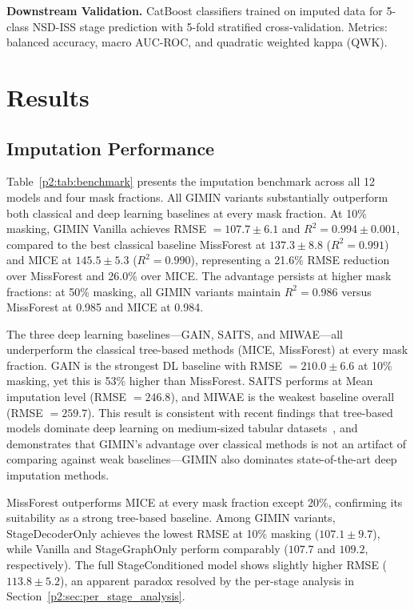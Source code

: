 \textbf{Downstream Validation.} CatBoost classifiers trained on imputed data for 5-class NSD-ISS stage prediction with 5-fold stratified cross-validation. Metrics: balanced accuracy, macro AUC-ROC, and quadratic weighted kappa (QWK).

\section{Results}
\label{p2:sec:results}

\subsection{Imputation Performance}

Table~\ref{p2:tab:benchmark} presents the imputation benchmark across all 12 models and four mask fractions. All GIMIN variants substantially outperform both classical and deep learning baselines at every mask fraction. At 10\% masking, GIMIN Vanilla achieves RMSE $= 107.7 \pm 6.1$ and $R^2 = 0.994 \pm 0.001$, compared to the best classical baseline MissForest at $137.3 \pm 8.8$ ($R^2 = 0.991$) and MICE at $145.5 \pm 5.3$ ($R^2 = 0.990$), representing a 21.6\% RMSE reduction over MissForest and 26.0\% over MICE. The advantage persists at higher mask fractions: at 50\% masking, all GIMIN variants maintain $R^2 = 0.986$ versus MissForest at 0.985 and MICE at 0.984.

The three deep learning baselines---GAIN, SAITS, and MIWAE---all underperform the classical tree-based methods (MICE, MissForest) at every mask fraction. GAIN is the strongest DL baseline with RMSE $= 210.0 \pm 6.6$ at 10\% masking, yet this is 53\% higher than MissForest. SAITS performs at Mean imputation level (RMSE $= 246.8$), and MIWAE is the weakest baseline overall (RMSE $= 259.7$). This result is consistent with recent findings that tree-based models dominate deep learning on medium-sized tabular datasets~\cite{grinsztajn2022,shwartzziv2022}, and demonstrates that GIMIN's advantage over classical methods is not an artifact of comparing against weak baselines---GIMIN also dominates state-of-the-art deep imputation methods.

MissForest outperforms MICE at every mask fraction except 20\%, confirming its suitability as a strong tree-based baseline. Among GIMIN variants, StageDecoderOnly achieves the lowest RMSE at 10\% masking ($107.1 \pm 9.7$), while Vanilla and StageGraphOnly perform comparably ($107.7$ and $109.2$, respectively). The full StageConditioned model shows slightly higher RMSE ($113.8 \pm 5.2$), an apparent paradox resolved by the per-stage analysis in Section~\ref{p2:sec:per_stage_analysis}.

